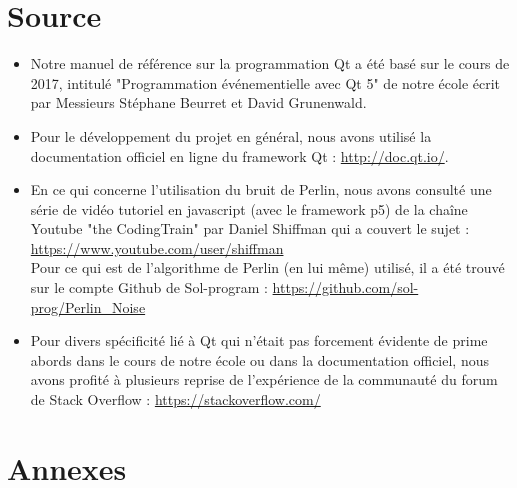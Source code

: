 \documentclass[a4paper,10pt,openany,oneside]{report}
\begin{document}
\chapter{Source}
\begin{itemize}
\item Notre manuel de référence sur la programmation Qt a été basé sur le cours de 2017, intitulé "Programmation événementielle avec Qt 5" de notre école écrit par Messieurs Stéphane Beurret et David Grunenwald.
\item Pour le développement du projet en général, nous avons utilisé la documentation officiel en ligne du framework Qt : \url{http://doc.qt.io/}.
\item En ce qui concerne l'utilisation du bruit de Perlin, nous avons consulté une série de vidéo tutoriel en javascript (avec le framework p5) de la chaîne Youtube "the CodingTrain" par Daniel Shiffman qui a couvert le sujet : \url{https://www.youtube.com/user/shiffman}\\
Pour ce qui est de l'algorithme de Perlin (en lui même) utilisé, il a été trouvé sur le compte Github de Sol-program :
\url{https://github.com/sol-prog/Perlin_Noise}
\item Pour divers spécificité lié à Qt qui n'était pas forcement évidente de prime abords dans le cours de notre école ou dans la documentation officiel, nous avons profité à plusieurs reprise de l'expérience de la communauté du forum de Stack Overflow : \url{https://stackoverflow.com/}
\end{itemize}

\chapter{Annexes}
\thispagestyle{headings}
\end{document}
